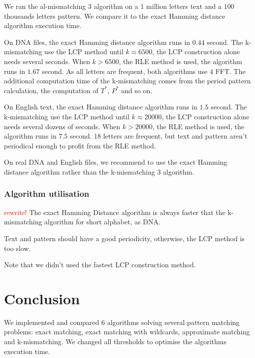 \documentclass[preprint,12pt]{elsarticle}
\begin{document}
We ran the al-mismatching $3$ algorithm
on a $1$ million letters text and a $100$ thousands letters pattern.
We compare it to the exact Hamming distance algorithm execution time.

On DNA files, the exact Hamming distance algorithm runs in $0.44$ second.
The k-mismatching use the LCP method until $k \approx 6500$,
the LCP construction alone needs several seconds.
When $k>6500$, the RLE method is used, the algorithm runs in $1.67$ second.
As all letters are frequent, both algorithms use $4$ FFT.
The additional computation time of the k-mismatching  comes from the period pattern calculation,
the computation of $T^*$, $P^*$ and so on.

On English text, the exact Hamming distance algorithm runs in $1.5$ second.
The k-mismatching use the LCP method until $k \approx 20000$,
the LCP construction alone needs several dozens of seconds.
When $k>20000$, the RLE method is used, the algorithm runs in $7.5$ second.
$18$ letters are frequent, but text and pattern aren't periodical enough to profit from the RLE method.

On real DNA and English files,
we recommend to use the exact Hamming distance algorithm rather than the k-mismatching $3$ algorithm.


\subsubsection*{Algorithm utilisation}

\textcolor{red}{rewrite!}
The exact Hamming Distance algorithm is always faster that the k-mismatching algorithm for short alphabet, as DNA.

Text and pattern should have a good periodicity, otherwise, the LCP method is too slow.

Note that we didn't used the fastest LCP construction method.








\section*{Conclusion}

We implemented and compared $6$ algorithms solving several pattern matching problems: 
exact matching, exact matching with wildcards, approximate matching and k-mismatching.
We changed all thresholds to optimise the algorithms execution time.
\end{document}
